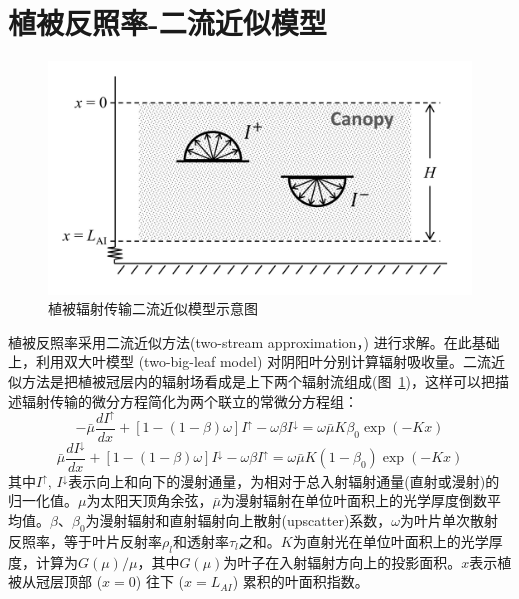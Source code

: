\section{植被反照率-二流近似模型}\label{植被反照率二流近似模型}
{
\begin{figure}[]
\centering
\includegraphics[width=0.7\columnwidth]{Figures/辐射过程及辐射通量计算/二流近似模型示意图.png}
\caption{植被辐射传输二流近似模型示意图}
\label{fig:二流近似模型示意图}
\end{figure}
}
植被反照率采用二流近似方法(two-stream approximation，\citet{dickinson1983land,sellers1985canopy}) 进行求解。在此基础上，利用双大叶模型 (two-big-leaf model) \citep{dai2004two} 对阴阳叶分别计算辐射吸收量。二流近似方法是把植被冠层内的辐射场看成是上下两个辐射流组成(图~\ref{fig:二流近似模型示意图})，这样可以把描述辐射传输的微分方程简化为两个联立的常微分方程组：
\begin{equation}\label{di_dx1}
-\bar{\mu} \frac{d I^{\uparrow}}{d x}+\left[1-(1-\beta) \omega\right] I^{\uparrow}-\omega \beta I^{\downarrow}=\omega \bar{\mu} K \beta_{0} \exp (-K x)
\end{equation}
\begin{equation}\label{di_dx2}
\bar{\mu} \frac{d I^{\downarrow}}{d x}+\left[1-(1-\beta) \omega\right] I^{\downarrow}-\omega \beta I^{\uparrow}=\omega \bar{\mu} K\left(1-\beta_{0}\right) \exp (-K x)
\end{equation}
其中$I^{\uparrow}$, $I^{\downarrow}$表示向上和向下的漫射通量，为相对于总入射辐射通量(直射或漫射)的归一化值。$\mu$为太阳天顶角余弦，$\bar{\mu}$为漫射辐射在单位叶面积上的光学厚度倒数平均值。$\beta$、$\beta_{0}$为漫射辐射和直射辐射向上散射(upscatter)系数，$\omega$为叶片单次散射反照率，等于叶片反射率$\rho_{l}$和透射率$\tau_{l}$之和。$K$为直射光在单位叶面积上的光学厚度，计算为$G(\mu) / \mu$，其中$G(\mu)$为叶子在入射辐射方向上的投影面积。$x$表示植被从冠层顶部 ($x=0$) 往下 ($x=L_{AI}$) 累积的叶面积指数。

